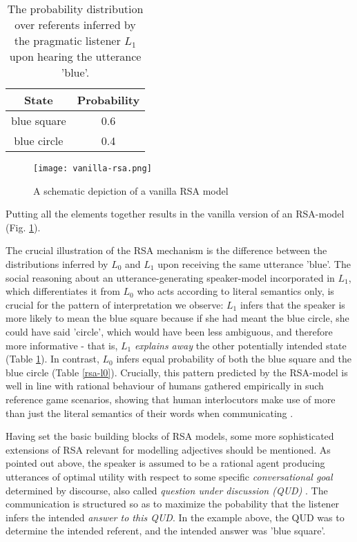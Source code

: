 \begin{table}[h]
	\begin{center}
		\caption{The probability distribution over referents inferred by the pragmatic listener $L_1$ upon hearing the utterance 'blue'.}
		\label{rsa-l1}
		\vskip 0.12in
		\begin{tabular}{cc}
			State & Probability \\
			\hline
			blue square & 0.6 \\
			blue circle & 0.4
		\end{tabular}
	\end{center}
\end{table}

\begin{figure*}[t]
	\begin{center}
		\texttt{[image: vanilla-rsa.png]}
	\end{center}
	\vspace{-0.3cm}
	\caption{A schematic depiction of a vanilla RSA model \parencite{problang}}
	\label{vanilla-rsa}
\end{figure*}
Putting all the elements together results in the vanilla version of an RSA-model (Fig. \ref{vanilla-rsa}).

The crucial illustration of the RSA mechanism is the difference between the distributions inferred by $L_0$ and $L_1$ upon receiving the same utterance 'blue'. The social reasoning about an utterance-generating speaker-model incorporated in $L_1$, which differentiates it from $L_0$ who acts according to literal semantics only, is crucial for the pattern of interpretation we observe: $L_1$ infers that the speaker is more likely to mean the blue square because if she had meant the blue circle, she could have said 'circle', which would have been less ambiguous, and therefore more informative - that is, $L_1$ \emph{explains away} the other potentially intended state (Table \ref{rsa-l1}). In contrast, $L_0$ infers equal probability of both the blue square and the blue circle (Table \ref{rsa-l0}). Crucially, this pattern predicted by the RSA-model is well in line with rational behaviour of humans gathered empirically in such reference game scenarios, showing that human interlocutors make use of more than just the literal semantics of their words when communicating \parencite{frank2012predicting, problang}.

Having set the basic building blocks of RSA models, some more sophisticated extensions of RSA relevant for modelling adjectives should be mentioned. 
As pointed out above, the speaker is assumed to be a rational agent producing utterances of optimal utility with respect to some specific \emph{conversational goal} determined by discourse, also called \emph{question under discussion (QUD)}  \parencite{lassiter2017adjectival}. The communication is structured so as to maximize the pobability that the listener infers the intended \emph{answer to this QUD}. In the example above, the QUD was to determine the intended referent, and the intended answer was 'blue square'.   

